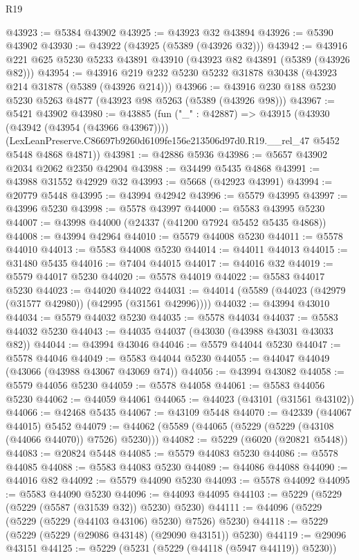 \begin{lexlean}{R19}
\begin{coremodule}
@43923 := @5384 @43902
@43925 := @43923 @32 @43894
@43926 := @5390 @43902
@43930 := @43922 (@43925 (@5389 (@43926 @32)))
@43942 := @43916 @221 @625 @5230 @5233 @43891 @43910 (@43923 @82 @43891 (@5389 (@43926 @82)))
@43954 := @43916 @219 @232 @5230 @5232 @31878 @30438 (@43923 @214 @31878 (@5389 (@43926 @214)))
@43966 := @43916 @230 @188 @5230 @5230 @5263 @4877 (@43923 @98 @5263 (@5389 (@43926 @98)))
@43967 := @5421 @43902
@43980 := @43885
    (fun ("_" : @42887) =>
    @43915
      (@43930 (@43942 (@43954 (@43966 @43967))))
      (LexLeanPreserve.C86697b9260d6109fe156e213506d97d0.R19.__rel_47 @5452 @5448 @4868 @4871))
@43981 := @42886 @5936
@43986 := @5657 @43902 @2034 @2062 @2350 @42904
@43988 := @34499 @5435 @4868
@43991 := @43988 @31552 @42929 @32
@43993 := @5668 (@42923 @43991)
@43994 := @20779 @5448
@43995 := @43994 @42942
@43996 := @5579 @43995
@43997 := @43996 @5230
@43998 := @5578 @43997
@44000 := @5583 @43995 @5230
@44007 := @43998 @44000 (@24337 (@41200 @7924 @5452 @5435 @4868))
@44008 := @43994 @42964
@44010 := @5579 @44008 @5230
@44011 := @5578 @44010
@44013 := @5583 @44008 @5230
@44014 := @44011 @44013
@44015 := @31480 @5435
@44016 := @7404 @44015
@44017 := @44016 @32
@44019 := @5579 @44017 @5230
@44020 := @5578 @44019
@44022 := @5583 @44017 @5230
@44023 := @44020 @44022
@44031 := @44014 (@5589 (@44023 (@42979 (@31577 @42980)) (@42995 (@31561 @42996))))
@44032 := @43994 @43010
@44034 := @5579 @44032 @5230
@44035 := @5578 @44034
@44037 := @5583 @44032 @5230
@44043 := @44035 @44037 (@43030 (@43988 @43031 @43033 @82))
@44044 := @43994 @43046
@44046 := @5579 @44044 @5230
@44047 := @5578 @44046
@44049 := @5583 @44044 @5230
@44055 := @44047 @44049 (@43066 (@43988 @43067 @43069 @74))
@44056 := @43994 @43082
@44058 := @5579 @44056 @5230
@44059 := @5578 @44058
@44061 := @5583 @44056 @5230
@44062 := @44059 @44061
@44065 := @44023 (@43101 (@31561 @43102))
@44066 := @42468 @5435
@44067 := @43109 @5448
@44070 := @42339 (@44067 @44015) @5452
@44079 := @44062 (@5589 (@44065 (@5229 (@5229 (@43108 (@44066 @44070)) @7526) @5230)))
@44082 := @5229 (@6020 (@20821 @5448))
@44083 := @20824 @5448
@44085 := @5579 @44083 @5230
@44086 := @5578 @44085
@44088 := @5583 @44083 @5230
@44089 := @44086 @44088
@44090 := @44016 @82
@44092 := @5579 @44090 @5230
@44093 := @5578 @44092
@44095 := @5583 @44090 @5230
@44096 := @44093 @44095
@44103 := @5229 (@5229 (@5229 (@5587 (@31539 @32)) @5230) @5230)
@44111 := @44096 (@5229 (@5229 (@5229 (@44103 @43106) @5230) @7526) @5230)
@44118 := @5229 (@5229 (@5229 (@29086 @43148) (@29090 @43151)) @5230)
@44119 := @29096 @43151
@44125 := @5229 (@5231 (@5229 (@44118 (@5947 @44119)) @5230))

\end{coremodule}
\end{lexlean}
